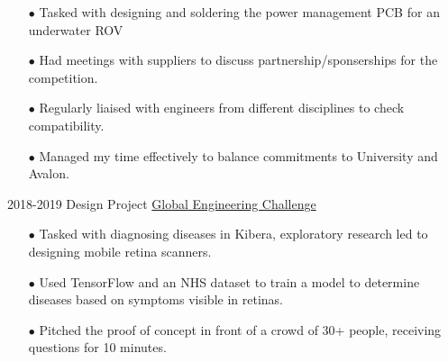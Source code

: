 \documentclass[9pt]{developercv} %
\begin{document}
\begin{entrylist}
{\begin{itemize}
					\item[$\bullet$\hspace*{0.5cm}] Tasked with designing and soldering the power management PCB for an underwater ROV
					\item[$\bullet$\hspace*{0.5cm}] Had meetings with suppliers to discuss partnership/sponserships for the competition.
					\item[$\bullet$\hspace*{0.5cm}] Regularly liaised with engineers from different disciplines to check compatibility.
					\item[$\bullet$\hspace*{0.5cm}] Managed my time effectively to balance commitments to University and Avalon.
				\end{itemize}		
			}
			\entry
			{2018-2019}
			{Design Project}
			{\href{https://www.sheffield.ac.uk/engineering/study/global-engineering-challenge}{Global Engineering Challenge}}
			{
				\begin{itemize}
					\item[$\bullet$\hspace*{0.5cm}] Tasked with diagnosing diseases in Kibera, exploratory research led to designing mobile retina scanners. 
					\item[$\bullet$\hspace*{0.5cm}] Used TensorFlow and an NHS dataset to train a model to determine diseases based on symptoms visible in retinas.
					\item[$\bullet$\hspace*{0.5cm}] Pitched the proof of concept in front of a crowd of 30+ people, receiving questions for 10 minutes.
				\end{itemize}	
			}	
	\end{entrylist}
\end{document}
